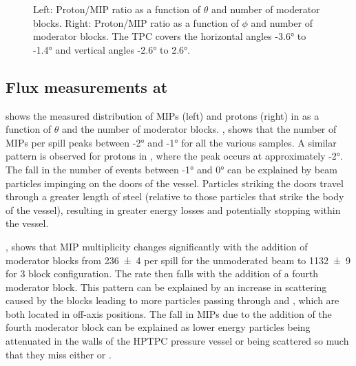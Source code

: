 \begin{figure}[h]
  \begin{minipage}[t]{.5\textwidth}
    \begin{adjustbox}{max totalsize=\textwidth, center}
      
    \end{adjustbox}
  \end{minipage}
  \hfill
  \begin{minipage}[t]{.5\textwidth}
    \begin{adjustbox}{max totalsize=\textwidth, center}
      
    \end{adjustbox}
  \end{minipage}
  \caption[Proton/MIP ratios as a function of off-axis angle and number of moderator blocks]{Left: Proton/MIP ratio as a function of $\theta$ and number of moderator blocks. Right: Proton/MIP ratio as a function of $\phi$ and number of moderator blocks. The TPC covers the horizontal angles \ang{-3.6} to \ang{-1.4} and vertical angles \ang{-2.6} to \ang{+2.6}.}
  \label{fig:s3Ratios}
\end{figure}

\subsection{Flux measurements at \SFour}
\label{sec:hptpc_beam_flux:results:s4}

 shows the measured distribution of MIPs (left) and protons (right) in \SFour as a function of $\theta$ and the number of moderator blocks.
, shows that the number of MIPs per spill peaks between \ang{-2} and \ang{-1} for all the various samples.
A similar pattern is observed for protons in , where the peak occurs at approximately \ang{-2}.
The fall in the number of events between \ang{-1} and \ang{0} can be explained by beam particles impinging on the doors of the vessel.
Particles striking the doors travel through a greater length of steel (relative to those particles that strike the body of the vessel), resulting in greater energy losses and potentially stopping within the vessel.

, shows that MIP multiplicity changes significantly with the addition of moderator blocks from \num{236(4)} per spill for the unmoderated beam to \num{1132(9)} for 3 block configuration.
The rate then falls with the addition of a fourth moderator block.
This pattern can be explained by an increase in scattering caused by the blocks leading to more particles passing through \STwo and \SFour, which are both located in off-axis positions.
The fall in MIPs due to the addition of the fourth moderator block can be explained as lower energy particles being attenuated in the walls of the HPTPC pressure vessel or being scattered so much that they miss either \STwo or \SFour.

